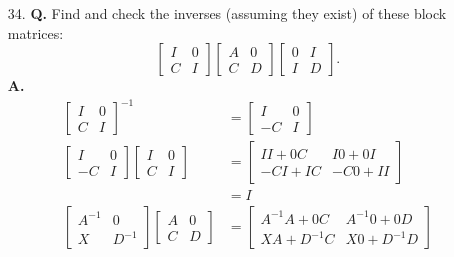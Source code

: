 \documentclass[main.tex]{subfiles}
\begin{document}
\begin{enumerate}
    \item [34.] \textbf{Q.} Find and check the inverses (assuming they exist) of these block matrices:
    $$
    \left[\begin{array}{ll}
    I & 0 \\
    C & I
    \end{array}\right]\left[\begin{array}{ll}
    A & 0 \\
    C & D
    \end{array}\right]\left[\begin{array}{ll}
    0 & I \\
    I & D
    \end{array}\right] .
    $$
    \textbf{A.}
    $$
    \begin{aligned}
    \left[\begin{array}{ll}
    I & 0 \\
    C & I
    \end{array}\right]^{-1} &= \left[\begin{array}{cc}
    I & 0 \\
    -C & I
    \end{array}\right]\\
    \left[\begin{array}{cc}
    I & 0 \\
    -C & I
    \end{array}\right]\left[\begin{array}{ll}
    I & 0 \\
    C & I
    \end{array}\right] &=\left[\begin{array}{cc}
    I I+0 C & I 0+0 I \\
    -C I+I C & -C 0+I I
    \end{array}\right] \\
    & = I\\
    \left[\begin{array}{cc}
    A^{-1} & 0 \\
    X & D^{-1}
    \end{array}\right]\left[\begin{array}{cc}
    A & 0 \\
    C & D
    \end{array}\right]&=\left[\begin{array}{cc}
    A^{-1} A+0 C & A^{-1} 0+0 D \\
    X A+D^{-1} C & X 0+D^{-1} D
    \end{array}\right]\\

\end{aligned}$$
\end{enumerate}
\end{document}
